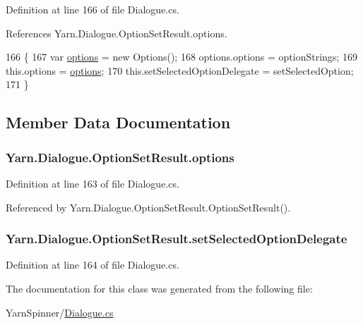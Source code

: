 Definition at line 166 of file Dialogue.\-cs.



References Yarn.\-Dialogue.\-Option\-Set\-Result.\-options.


\begin{DoxyCode}
166                                                                                                   \{
167                 var \hyperlink{a00135_abda9c3047ff9d3c3ec5540566a239315}{options} = \textcolor{keyword}{new} Options();
168                 options.options = optionStrings;
169                 this.options = \hyperlink{a00135_abda9c3047ff9d3c3ec5540566a239315}{options};
170                 this.setSelectedOptionDelegate = setSelectedOption;
171             \}
\end{DoxyCode}


\subsection{Member Data Documentation}
\hypertarget{a00135_abda9c3047ff9d3c3ec5540566a239315}{
\subsubsection[{options}]{ Yarn.\-Dialogue.\-Option\-Set\-Result.\-options}}\label{a00135_abda9c3047ff9d3c3ec5540566a239315}


Definition at line 163 of file Dialogue.\-cs.



Referenced by Yarn.\-Dialogue.\-Option\-Set\-Result.\-Option\-Set\-Result().

\hypertarget{a00135_a6f2683598cf0f62b76bb864640cc79dd}{
\subsubsection[{set\-Selected\-Option\-Delegate}]{ Yarn.\-Dialogue.\-Option\-Set\-Result.\-set\-Selected\-Option\-Delegate}}\label{a00135_a6f2683598cf0f62b76bb864640cc79dd}


Definition at line 164 of file Dialogue.\-cs.



The documentation for this class was generated from the following file\-:\begin{DoxyCompactItemize}
\item 
Yarn\-Spinner/\hyperlink{a00290}{Dialogue.\-cs}\end{DoxyCompactItemize}
